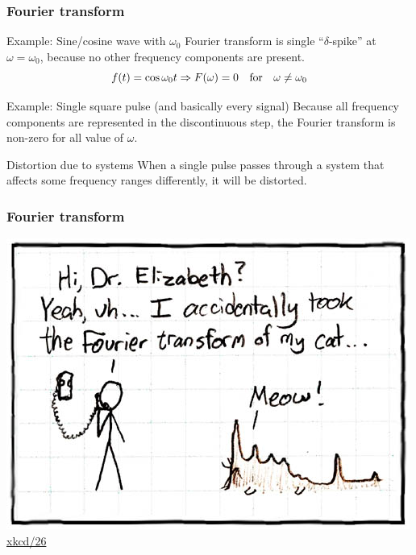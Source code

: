 \documentclass[beamer]{standalone}
\begin{document}
\begin{frame}
 \frametitle{Fourier transform}
 \begin{block}{Example: Sine/cosine wave with $\omega_0$}
  Fourier transform is single ``$\delta$-spike'' at $\omega = \omega_0$, because no other frequency components are present.
  \[ f(t) = \cos\omega_0 t \Rightarrow F(\omega) = 0 \quad \hbox{for} \quad \omega \ne \omega_0 \]
 \end{block}
 \begin{block}{Example: Single square pulse (and basically every signal)}
  Because all frequency components are represented in the discontinuous step, the Fourier transform is non-zero for all value of $\omega$.
 \end{block}
 \begin{block}{Distortion due to systems}
  When a single pulse passes through a system that affects some frequency ranges differently, it will be distorted.
 \end{block}
\end{frame}

\begin{frame}
\frametitle{Fourier transform}
\begin{center}
\includegraphics[height=0.7\textheight]{pics/fourier} \\
\href{http://xkcd.com/26}{xkcd/26}
\end{center}
\end{frame}
\end{document}
